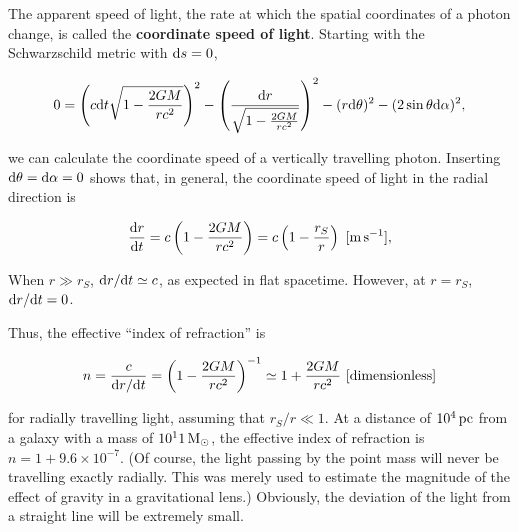\documentclass[a4paper,10pt]{article}
\begin{document}
{\noindent}The apparent speed of light, the rate at which the spatial coordinates of a photon change, is called the \textbf{coordinate speed of light}. Starting with the Schwarzschild metric with ${\rm d}s=0$,

\begin{align*}
    0 = \left(c{\rm d}t \sqrt{1-\frac{2GM}{rc^2}}\right)^2 - \left(\frac{{\rm d}r}{\sqrt{1-\frac{2GM}{rc^2}}}\right)^2 - (r{\rm d}\theta)^2 - (2\sin\theta{\rm d}\alpha)^2,
\end{align*}

{\noindent}we can calculate the coordinate speed of a vertically travelling photon. Inserting ${\rm d}\theta={\rm d}\alpha=0$ shows that, in general, the coordinate speed of light in the radial direction is

\begin{align*}
    \frac{{\rm d}r}{{\rm d}t} = c\left(1-\frac{2GM}{rc^2}\right) = c\left(1-\frac{r_S}{r}\right) ~ [{\rm m\,s^{-1}}],
\end{align*}

{\noindent}When $r\gg r_S$, ${\rm d}r/{\rm d}t\simeq c$, as expected in flat spacetime. However, at $r=r_S$, ${\rm d}r/{\rm d}t=0$.

{\noindent}Thus, the effective ``index of refraction'' is

\begin{align*}
    n = \frac{c}{{\rm d}r/{\rm d}t} = \left(1-\frac{2GM}{rc^2}\right)^{-1} \simeq 1+ \frac{2GM}{rc^2} ~ [{\rm dimensionless}]
\end{align*}

{\noindent}for radially travelling light, assuming that $r_S/r\ll1$. At a distance of $10^4\,{\rm pc}$ from a galaxy with a mass of $10^11\,{\rm M_\odot}$, the effective index of refraction is $n=1+9.6\times10^{-7}$. (Of course, the light passing by the point mass will never be travelling exactly radially. This was merely used to estimate the magnitude of the effect of gravity in a gravitational lens.) Obviously, the deviation of the light from a straight line will be extremely small. 
\end{document}
